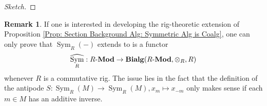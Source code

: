 \documentclass{amsart}
\theoremstyle{definition}
\newtheorem{remark}[equation]{Remark}
\newcommand{\bang}{\mathexclamationmark}
\DeclareMathOperator{\sym}{Sym}
\newcommand{\CAlg}[1]{\mathbf{CAlg}_{#1}}
\newcommand{\Sym}[1]{\sym_{#1}}
\let\epsilon\varepsilon
\let\epsilon\varepsilon
\newcommand{\Mod}[1]{{#1}\textnormal{-}\mathbf{Mod}}
\numberwithin{equation}{subsection}
\begin{document}
\begin{proof}[Sketch]
\end{proof}
\begin{remark}
If one is interested in developing the rig-theoretic extension of Proposition \ref{Prop: Section Background Alg: Symmetric Alg is Coalg}, one can only prove that $\Sym{R}(-)$ extends to is a functor
\[
\widehat{\Sym{R}}:\Mod{R} \to \mathbf{Bialg}(\Mod{R},\otimes_R,R)
\]
whenever $R$ is a commutative rig. The issue lies in the fact that the definition of the antipode $S:\Sym{R}(M) \to \Sym{R}(M), x_m \mapsto x_{-m}$ only makes sense if each $m \in M$ has an additive inverse.
\end{remark}
\end{document}
